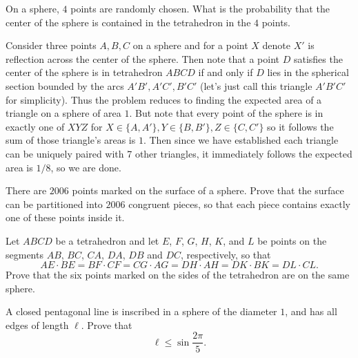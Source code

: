 \begin{question}[name={1992 Putnam}]
	On a sphere, $4$ points are randomly chosen. What is the probability that the center of the sphere is contained in the tetrahedron in the $4$ points.
\end{question}

\begin{solution}[name={Solution by Dinoboy}]
	Consider three points $A,B,C$ on a sphere and for a point $X$ denote $X'$ is reflection across the center of the sphere. Then note that a point $D$ satisfies the center of the sphere is in tetrahedron $ABCD$ if and only if $D$ lies in the spherical section bounded by the arcs $A'B', A'C', B'C'$ (let's just call this triangle $A'B'C'$ for simplicity). Thus the problem reduces to finding the expected area of a triangle on a sphere of area $1$. But note that every point of the sphere is in exactly one of $XYZ$ for $X \in \{A,A'\}, Y \in \{B,B'\}, Z \in \{C,C'\}$ so it follows the sum of those triangle's areas is $1$. Then since we have established each triangle can be uniquely paired with 7 other triangles, it immediately follows the expected area is $1/8$, so we are done.
\end{solution}



\begin{question}[name={2006 Baltic Way}]
	There are $2006$ points marked on the surface of a sphere. Prove that the surface can be partitioned into $2006$ congruent pieces, so that each piece contains exactly one of these points inside it.
\end{question}


\begin{question}[name={2016 Brazil Cono Sur Training}]
	Let $ABCD$ be a tetrahedron and let $E$, $F$, $G$, $H$, $K$, and $L$ be points on the segments $AB$, $BC$, $CA$, $DA$, $DB$ and $DC$, respectively, so that $$AE \cdot BE = BF\cdot  CF = CG \cdot  AG = DH \cdot  AH = DK \cdot  BK = DL \cdot  CL.$$ Prove that the six points marked on the sides of the tetrahedron are on the same sphere.
\end{question}


\begin{question}[name={2000 Belarus TST}]
	A closed pentagonal line is inscribed in a sphere of the diameter $1$, and has all edges of length $\ell$.
	Prove that $$\ell \le  \sin \frac{2\pi}{5}.$$
\end{question}



